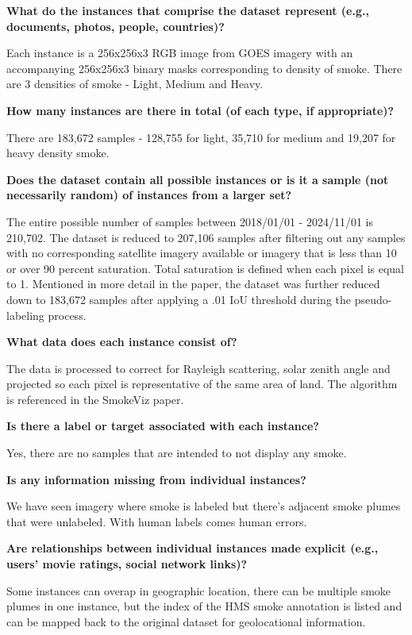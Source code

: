 \documentclass{article}
\begin{document}
\textbf{What do the instances that comprise the dataset represent (e.g., documents, photos, people, countries)?}

Each instance is a 256x256x3 RGB image from GOES imagery with an accompanying 256x256x3 binary masks corresponding to density of smoke. There are 3 densities of smoke - Light, Medium and Heavy.


\textbf{How many instances are there in total (of each type, if appropriate)?} 

There are 183,672 samples - 128,755 for light, 35,710 for medium and 19,207 for heavy density smoke.


\textbf{Does the dataset contain all possible instances or is it a sample (not necessarily random) of instances from a larger set? }

The entire possible number of samples between 2018/01/01 - 2024/11/01 is 210,702. The dataset is reduced to 207,106 samples after filtering out any samples with no corresponding satellite imagery available or imagery that is less than 10 or over 90 percent saturation. Total saturation is defined when each pixel is equal to 1. Mentioned in more detail in the paper, the dataset was further reduced down to 183,672 samples after applying a .01 IoU threshold during the pseudo-labeling process.

\textbf{What data does each instance consist of? }

The data is processed to correct for Rayleigh scattering, solar zenith angle and projected so each pixel is representative of the same area of land. The algorithm is referenced in the SmokeViz paper.

\textbf{Is there a label or target associated with each instance?}

Yes, there are no samples that are intended to not display any smoke.

\textbf{Is any information missing from individual instances?}

We have seen imagery where smoke is labeled but there's adjacent smoke plumes that were unlabeled. With human labels comes human errors.

\textbf{Are relationships between individual instances made explicit (e.g., users’ movie ratings, social network links)?}

Some instances can overap in geographic location, there can be multiple smoke plumes in one instance, but the index of the HMS smoke annotation is listed and can be mapped back to the original dataset for geolocational information.
\end{document}

